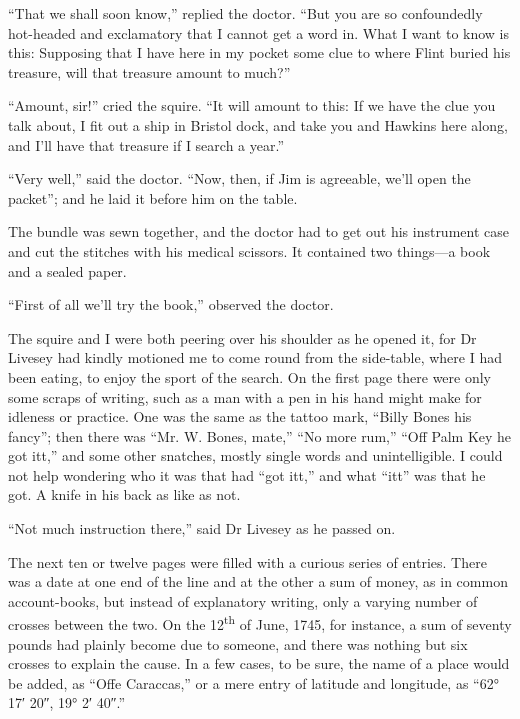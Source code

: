 \enquote{That we shall soon know,} replied the doctor. \enquote{But you are so confoundedly hot-headed and exclamatory that I cannot get a word in. What I want to know is this: Supposing that I have here in my pocket some clue to where Flint buried his treasure, will that treasure amount to much?}

\enquote{Amount, sir!} cried the squire. \enquote{It will amount to this: If we have the clue you talk about, I fit out a ship in Bristol dock, and take you and Hawkins here along, and I’ll have that treasure if I search a year.}

\enquote{Very well,} said the doctor. \enquote{Now, then, if Jim is agreeable, we’ll open the packet}; and he laid it before him on the table.

The bundle was sewn together, and the doctor had to get out his instrument case and cut the stitches with his medical scissors. It contained two things---a book and a sealed paper.

\enquote{First of all we’ll try the book,} observed the doctor.

The squire and I were both peering over his shoulder as he opened it, for Dr Livesey had kindly motioned me to come round from the side-table, where I had been eating, to enjoy the sport of the search. On the first page there were only some scraps of writing, such as a man with a pen in his hand might make for idleness or practice. One was the same as the tattoo mark, \enquote{Billy Bones his fancy}; then there was \enquote{Mr. W. Bones, mate,} \enquote{No more rum,} \enquote{Off Palm Key he got itt,} and some other snatches, mostly single words and unintelligible. I could not help wondering who it was that had \enquote{got itt,} and what \enquote{itt} was that he got. A knife in his back as like as not.

\enquote{Not much instruction there,} said Dr Livesey as he passed on.

The next ten or twelve pages were filled with a curious series of entries. There was a date at one end of the line and at the other a sum of money, as in common account-books, but instead of explanatory writing, only a varying number of crosses between the two. On the 12\textsuperscript{th} of June, 1745, for instance, a sum of seventy pounds had plainly become due to someone, and there was nothing but six crosses to explain the cause. In a few cases, to be sure, the name of a place would be added, as \enquote{Offe Caraccas,} or a mere entry of latitude and longitude, as \enquote{62° 17′ 20″, 19° 2′ 40″.}

